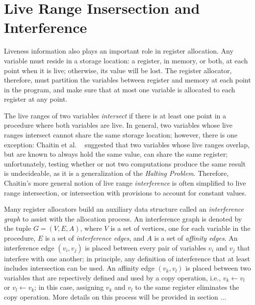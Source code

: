 \section{Live Range Insersection and Interference}
\label{part1:ssaprop:subtrees}

Liveness information also plays an important role in
register allocation. Any variable must reside in a 
storage location: a register, in memory, or both, at each
point when it is live; otherwise, its value will be lost.
The register allocator, therefore, must partition the
variables between register and memory at each point in
the program, and make sure that at most one variable is
allocated to each register at any point. 

The live ranges of two variables \emph{intersect} if
there is at least one point in a procedure where both
variables are live. In general, two variables whose live
ranges intersect cannot share the same storage location;
however, there is one exception: Chaitin et al.
~\cite{Chaitin81,ChaitinJun82} suggested that two variables
whose live ranges overlap, but are known to always hold
the same value, can share the same register; unfortunately,
testing whether or not two computations produce the same
result is undecideable, as it is a generalization of
the \emph{Halting Problem}. Therefore, Chaitin's more
general notion of live range \emph{interference} is often 
simplified to live range intersection, or intersection
with provisions to account for constant values. 

Many register allocators build an auxiliary data structure
called an \emph{interference graph} to assist with the
allocation process. An interference graph is denoted by
the tuple $G = (V, E, A)$, where $V$ is a set of vertices,
one for each variable in the procedure, $E$ is a set of
\emph{interference edges}, and $A$ is a set of 
\emph{affinity edges}. An interference edge $(v_{i}, v_{j})$
is placed between every pair of variables $v_{i}$ and 
$v_{j}$ that interfere with one another; in principle,
any definition of interference that at least includes
intersection can be used. An affinity edge $(v_{k}, v_{l})$
is placed between two variables that are repectively 
defined and used by a copy operation, i.e., 
$v_{k} \leftarrow v_{l}$ or $v_{l} \leftarrow v_{k}$;
in this case, assigning $v_{k}$ and $v_{l}$ to the
same register eliminates the copy operation. More details
on this process will be provided in section ...

